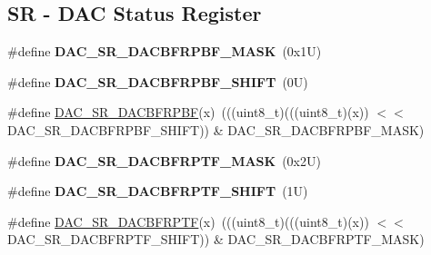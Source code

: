 \subsection*{SR -\/ D\+AC Status Register}
\begin{DoxyCompactItemize}
\item 
\mbox{\label{group___d_a_c___register___masks_ga5af56fd75a9c5b74fe07c8f303d452aa}} 
\#define {\bfseries D\+A\+C\+\_\+\+S\+R\+\_\+\+D\+A\+C\+B\+F\+R\+P\+B\+F\+\_\+\+M\+A\+SK}~(0x1\+U)
\item 
\mbox{\label{group___d_a_c___register___masks_ga5581f254327f3d4e57b161b5c771fb1c}} 
\#define {\bfseries D\+A\+C\+\_\+\+S\+R\+\_\+\+D\+A\+C\+B\+F\+R\+P\+B\+F\+\_\+\+S\+H\+I\+FT}~(0\+U)
\item 
\#define \mbox{\hyperlink{group___d_a_c___register___masks_ga58daf0fee335108d3e29833050e418d8}{D\+A\+C\+\_\+\+S\+R\+\_\+\+D\+A\+C\+B\+F\+R\+P\+BF}}(x)~(((uint8\+\_\+t)(((uint8\+\_\+t)(x)) $<$$<$ D\+A\+C\+\_\+\+S\+R\+\_\+\+D\+A\+C\+B\+F\+R\+P\+B\+F\+\_\+\+S\+H\+I\+FT)) \& D\+A\+C\+\_\+\+S\+R\+\_\+\+D\+A\+C\+B\+F\+R\+P\+B\+F\+\_\+\+M\+A\+SK)
\item 
\mbox{\label{group___d_a_c___register___masks_ga662e824677c1a7a94ddd36e90f3d37d5}} 
\#define {\bfseries D\+A\+C\+\_\+\+S\+R\+\_\+\+D\+A\+C\+B\+F\+R\+P\+T\+F\+\_\+\+M\+A\+SK}~(0x2\+U)
\item 
\mbox{\label{group___d_a_c___register___masks_gad1df4286616f5369388e865f5f821ae9}} 
\#define {\bfseries D\+A\+C\+\_\+\+S\+R\+\_\+\+D\+A\+C\+B\+F\+R\+P\+T\+F\+\_\+\+S\+H\+I\+FT}~(1\+U)
\item 
\#define \mbox{\hyperlink{group___d_a_c___register___masks_ga9677e128f12db2c318c7eb821f5af0b1}{D\+A\+C\+\_\+\+S\+R\+\_\+\+D\+A\+C\+B\+F\+R\+P\+TF}}(x)~(((uint8\+\_\+t)(((uint8\+\_\+t)(x)) $<$$<$ D\+A\+C\+\_\+\+S\+R\+\_\+\+D\+A\+C\+B\+F\+R\+P\+T\+F\+\_\+\+S\+H\+I\+FT)) \& D\+A\+C\+\_\+\+S\+R\+\_\+\+D\+A\+C\+B\+F\+R\+P\+T\+F\+\_\+\+M\+A\+SK)
\end{DoxyCompactItemize}
